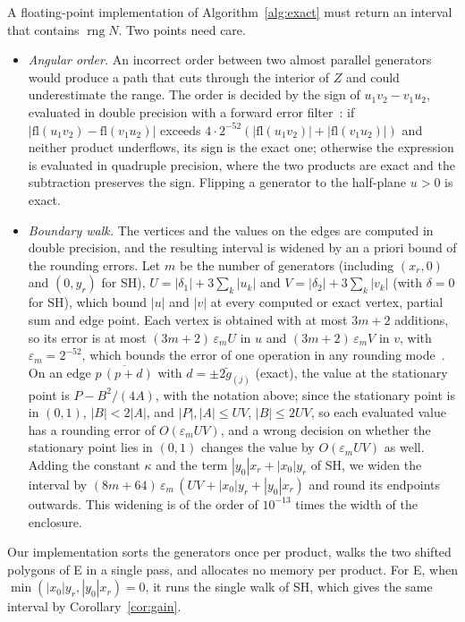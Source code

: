 \documentclass[10pt]{article}
\newcommand{\seg}[2]{\overline{#1\,#2}}
\theoremstyle{definition}
\newcommand{\eps}{\varepsilon}
\newcommand{\rng}{\operatorname{rng}}
\begin{document}
A floating-point implementation of Algorithm~\ref{alg:exact} must return an interval that contains $\rng N$. Two points need care.
\begin{itemize}
\item \emph{Angular order.} An incorrect order between two almost parallel generators would produce a path that cuts through the interior of $Z$ and could underestimate the range. The order is decided by the sign of $u_1v_2-v_1u_2$, evaluated in double precision with a forward error filter~\cite{shewchuk1997adaptive}: if $|\mathrm{fl}(u_1v_2)-\mathrm{fl}(v_1u_2)|$ exceeds $4\cdot2^{-52}(|\mathrm{fl}(u_1v_2)|+|\mathrm{fl}(v_1u_2)|)$ and neither product underflows, its sign is the exact one; otherwise the expression is evaluated in quadruple precision, where the two products are exact and the subtraction preserves the sign. Flipping a generator to the half-plane $u>0$ is exact.
\item \emph{Boundary walk.} The vertices and the values on the edges are computed in double precision, and the resulting interval is widened by an a priori bound of the rounding errors. Let $m$ be the number of generators (including $(x_r,0)$ and $(0,y_r)$ for SH), $U=|\delta_1|+3\sum_k|u_k|$ and $V=|\delta_2|+3\sum_k|v_k|$ (with $\delta=0$ for SH), which bound $|u|$ and $|v|$ at every computed or exact vertex, partial sum and edge point. Each vertex is obtained with at most $3m+2$ additions, so its error is at most $(3m+2)\,\eps_m U$ in $u$ and $(3m+2)\,\eps_m V$ in $v$, with $\eps_m=2^{-52}$, which bounds the error of one operation in any rounding mode~\cite{higham2002accuracy}. On an edge $\seg{p}{(p+d)}$ with $d=\pm2\tilde g_{(j)}$ (exact), the value at the stationary point is $P-B^2/(4A)$, with the notation above; since the stationary point is in $(0,1)$, $|B|<2|A|$, and $|P|,|A|\le UV$, $|B|\le2UV$, so each evaluated value has a rounding error of $O(\eps_m UV)$, and a wrong decision on whether the stationary point lies in $(0,1)$ changes the value by $O(\eps_m UV)$ as well. Adding the constant $\kappa$ and the term $|y_0|x_r+|x_0|y_r$ of SH, we widen the interval by $(8m+64)\,\eps_m\,(UV+|x_0|y_r+|y_0|x_r)$ and round its endpoints outwards. This widening is of the order of $10^{-13}$ times the width of the enclosure.
\end{itemize}
Our implementation sorts the generators once per product, walks the two shifted polygons of E in a single pass, and allocates no memory per product. For E, when $\min(|x_0|y_r,|y_0|x_r)=0$, it runs the single walk of SH, which gives the same interval by Corollary~\ref{cor:gain}.
\end{document}
